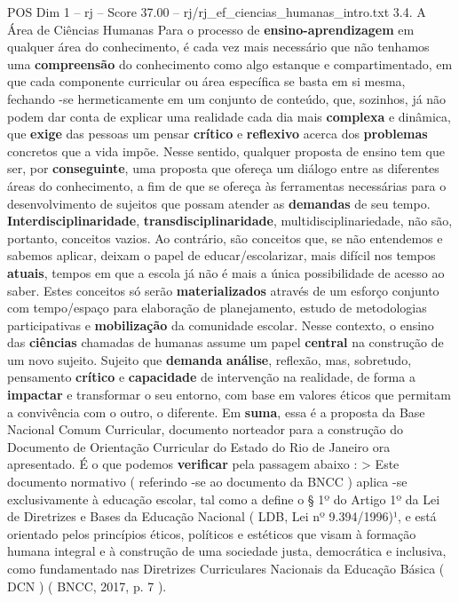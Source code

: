 \begin{textsample}{POS Dim 1 – rj – Score 37.00 – rj/rj\_ef\_ciencias\_humanas\_intro.txt}  \label{ex:f1_pos_274}
3.4.
A Área de Ciências Humanas Para o processo de \textbf{ensino-aprendizagem} em qualquer área do conhecimento, é cada vez mais necessário que não tenhamos uma \textbf{compreensão} do conhecimento como algo estanque e compartimentado, em que cada componente curricular ou área específica se basta em si mesma, fechando -se hermeticamente em um conjunto de conteúdo, que, sozinhos, já não podem dar conta de explicar uma realidade cada dia mais \textbf{complexa} e dinâmica, que \textbf{exige} das pessoas um pensar \textbf{crítico} e \textbf{reflexivo} acerca dos \textbf{problemas} concretos que a vida impõe.
Nesse sentido, qualquer proposta de ensino tem que ser, por \textbf{conseguinte}, uma proposta que ofereça um diálogo entre as diferentes áreas do conhecimento, a fim de que se ofereça às ferramentas necessárias para o desenvolvimento de sujeitos que possam atender as \textbf{demandas} de seu tempo. \textbf{Interdisciplinaridade}, \textbf{transdisciplinaridade}, multidisciplinariedade, não são, portanto, conceitos vazios.
Ao contrário, são conceitos que, se não entendemos e sabemos aplicar, deixam o papel de educar/escolarizar, mais difícil nos tempos \textbf{atuais}, tempos em que a escola já não é mais a única possibilidade de acesso ao saber.
Estes conceitos só serão \textbf{materializados} através de um esforço conjunto com tempo/espaço para elaboração de planejamento, estudo de metodologias participativas e \textbf{mobilização} da comunidade escolar.
Nesse contexto, o ensino das \textbf{ciências} chamadas de humanas assume um papel \textbf{central} na construção de um novo sujeito.
Sujeito que \textbf{demanda} \textbf{análise}, reflexão, mas, sobretudo, pensamento \textbf{crítico} e \textbf{capacidade} de intervenção na realidade, de forma a \textbf{impactar} e transformar o seu entorno, com base em valores éticos que permitam a convivência com o outro, o diferente.
Em \textbf{suma}, essa é a proposta da Base Nacional Comum Curricular, documento norteador para a construção do Documento de Orientação Curricular do Estado do Rio de Janeiro ora apresentado.
É o que podemos \textbf{verificar} pela passagem abaixo : > Este documento normativo ( referindo -se ao documento da BNCC ) aplica -se exclusivamente à educação escolar, tal como a define o § 1º do Artigo 1º da Lei de Diretrizes e Bases da Educação Nacional ( LDB, Lei nº 9.394/1996)¹, e está orientado pelos princípios éticos, políticos e estéticos que visam à formação humana integral e à construção de uma sociedade justa, democrática e inclusiva, como fundamentado nas Diretrizes Curriculares Nacionais da Educação Básica ( DCN ) ( BNCC, 2017, p. 7 ).

\end{textsample}
